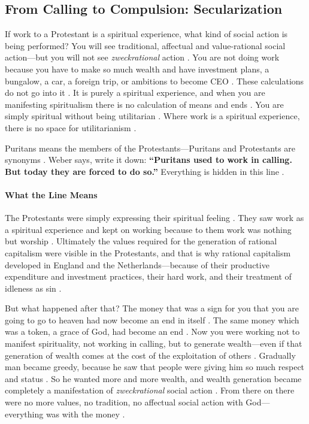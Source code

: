 \subsection{From Calling to Compulsion: Secularization}
If work to a Protestant is a spiritual experience, what kind of social action is being performed? You will see traditional, affectual and value-rational social action---but you will not see \textit{zweckrational} action .
You are not doing work because you have to make so much wealth and have investment plans, a bungalow, a car, a foreign trip, or ambitions to become CEO . These calculations do not go into it .
It is purely a spiritual experience, and when you are manifesting spiritualism there is no calculation of means and ends . You are simply spiritual without being utilitarian . Where work is a spiritual experience, there is no space for utilitarianism .

\begin{KeyConcept}
Puritans means the members of the Protestants---Puritans and Protestants are synonyms .
Weber says, write it down: \textbf{``Puritans used to work in calling. But today they are forced to do so.''} Everything is hidden in this line .
\end{KeyConcept}

\paragraph{What the Line Means}
The Protestants were simply expressing their spiritual feeling . They saw work as a spiritual experience and kept on working because to them work was nothing but worship .
Ultimately the values required for the generation of rational capitalism were visible in the Protestants, and that is why rational capitalism developed in England and the Netherlands---because of their productive expenditure and investment practices, their hard work, and their treatment of idleness as sin .

But what happened after that? The money that was a sign for you that you are going to go to heaven had now become an end in itself . The same money which was a token, a grace of God, had become an end .
Now you were working not to manifest spirituality, not working in calling, but to generate wealth---even if that generation of wealth comes at the cost of the exploitation of others .
Gradually man became greedy, because he saw that people were giving him so much respect and status . So he wanted more and more wealth, and wealth generation became completely a manifestation of \textit{zweckrational} social action . From there on there were no more values, no tradition, no affectual social action with God---everything was with the money .

